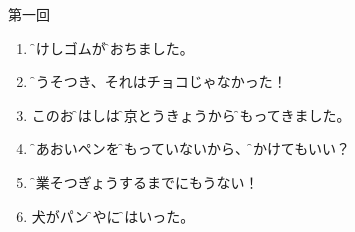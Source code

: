 \documentclass[intermediate]{grampig}
\begin{document}
	{\Large {} \hfill 第一回} \vspace{1em}
	
	\begin{enumerate}
		\item \parbox[t]{\linewidth}{\f{消}{け}しゴムが\e\ansline{}\f{落}{お}ちました。\hfill {}}
		\bh\strut
		
		\item \f{嘘}{うそ}つき、それはチョコじゃなかった！\hfill {}
		\bh\strut
		
		\item このお\f{箸}{はし}は\f{東京}{とうきょう}から\f{持}{も}ってきました。\hfill {}
		\bh\strut
		
		\item \f{青}{あお}いペンを\f{持}{も}っていないから、\e\ansline{}\f{書}{か}けてもいい？ \hfill {}
		\bh\strut
		
		\item \f{卒業}{そつぎょう}するまでにもうない！ \hfill {} 
		\bh\strut
		
		\item \e\ansline{}犬がパン\f{屋}{や}に\f{入}{はい}った。\hfill {}
		\bh\strut
	\end{enumerate}
\end{document}
